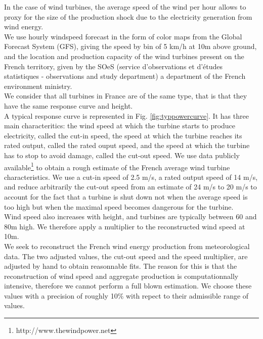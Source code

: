In the case of wind turbines, the average speed of the wind per hour allows to proxy for the size of the production shock due to the electricity generation from wind energy. \\

We use hourly windspeed forecast in the form of color maps from the Global Forecast System (GFS), giving the speed by bin of 5 km/h at 10m above ground, and the location and production capacity of the wind turbines present on the French territory, given by the SOeS (service d'observations et d'études statistiques - observations and study department) a department of the French environment ministry. \\

We consider that all turbines in France are of the same type, that is that they have the same response curve and height. \\

A typical response curve is represented in Fig. \ref{fig:typpowercurve}. It has three main characteritics: the wind speed at which the turbine starts to produce electricity, called the cut-in speed, the speed at which the turbine reaches its rated output, called the rated ouput speed, and the speed at which the turbine has to stop to avoid damage, called the cut-out speed. We use data publicly available\footnote{http://www.thewindpower.net } to obtain a rough estimate of the French average wind turbine characteristics. We use a cut-in speed of 2.5 m/s, a rated output speed of 14 m/s, and reduce arbitrarily the cut-out speed from an estimate of 24 m/s to 20 m/s to account for the fact that a turbine is shut down not when the average speed is too high but when the maximal speed becomes dangerous for the turbine.\\ 

Wind speed also increases with height, and turbines are typically between 60 and 80m high. We therefore apply a multiplier to the reconstructed wind speed at 10m. \\

We seek to reconstruct the French wind energy production from meteorological data. The two adjusted values, the cut-out speed and the speed multiplier, are adjusted by hand to obtain reasonnable fits. The reason for this is that the reconstruction of wind speed and aggregate production is computationnally intensive, therefore we cannot perform a full blown estimation. We choose these values with a precision of roughly 10\% with repect to their admissible range of values. \\

